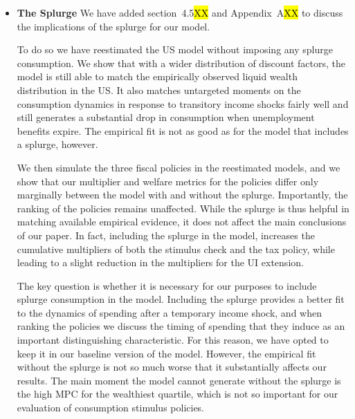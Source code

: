 \begin{itemize}
	\item \textbf{The Splurge} We have added section~4.5\hl{XX} and Appendix~A\hl{XX} to discuss the implications of the splurge for our model. 
	
	To do so we have reestimated the US model without imposing any splurge consumption. We show that with a wider distribution of discount factors, the model is still able to match the empirically observed liquid wealth distribution in the US. It also matches untargeted moments on the consumption dynamics in response to transitory income shocks fairly well and still generates a substantial drop in consumption when unemployment benefits expire. The empirical fit is not as good as for the model that includes a splurge, however.  
	
	We then simulate the three fiscal policies in the reestimated models, and we show that our multiplier and welfare metrics for the policies differ only marginally between the model with and without the splurge. Importantly, the ranking of the policies remains unaffected. While the splurge is thus helpful in matching available empirical evidence, it does not affect the main conclusions of our paper. In fact, including the splurge in the model, increases the cumulative multipliers of both the stimulus check and the tax policy, while leading to a slight reduction in the multipliers for the UI extension. 
	
	The key question is whether it is necessary for our purposes to include splurge consumption in the model. Including the splurge provides a better fit to the dynamics of spending after a temporary income shock, and when ranking the policies we discuss the timing of spending that they induce as an important distinguishing characteristic. For this reason, we have opted to keep it in our baseline version of the model. However, the empirical fit without the splurge is not so much worse that it substantially affects our results. The main moment the model cannot generate without the splurge is the high MPC for the wealthiest quartile, which is not so important for our evaluation of consumption stimulus policies. 
	
	

\end{itemize}
